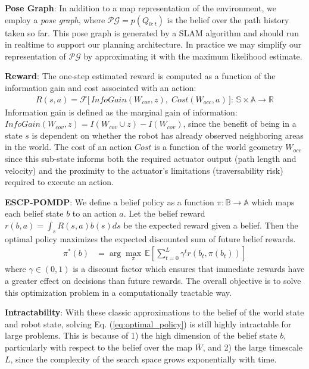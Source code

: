 \documentclass{article}
\newcommand{\ph}[1]{{\textbf{#1}:}} %
\begin{document}
\ph{Pose Graph} In addition to a map representation of the environment, we employ a \textit{pose graph}, where $\mathcal{PG} = p(Q_{0:t})$ is the belief over the path history taken so far.  This pose graph is generated by a SLAM algorithm and should run in realtime to support our planning architecture.  In practice we may simplify our representation of $\mathcal{PG}$ by approximating it with the maximum likelihood estimate.

\ph{Reward} The one-step estimated reward is computed as a function of the information gain and cost associated with an action:
\begin{align}
    {R}(s, a) = \mathcal{F}\Big[\, \textit{InfoGain}(W_{cov}, z), \; \textit{Cost}(W_{occ}, a) \, \Big]: \, \mathbb{S} \times \mathbb{A} \rightarrow \mathbb{R} 
\end{align}
Information gain is defined as the marginal gain of information: $\textit{InfoGain}(W_{cov}, z) = I(W_{cov} \cup z) - I(W_{cov})$, since the benefit of being in a state $s$ is dependent on whether the robot has already observed neighboring areas in the world. The cost of an action $Cost$ is a function of the world geometry $W_{occ}$ since this sub-state informs both the required actuator output (path length and velocity) and the proximity to the actuator's limitations (traversability risk) required to execute an action.

\ph{ESCP-POMDP} We define a belief policy as a function $\pi : \mathbb{B} \rightarrow \mathbb{A}$ which maps each belief state $b$ to an action $a$.  Let the belief reward $r(b,a)=\int_s R(s,a)b(s)ds$ be the expected reward given a belief.  Then the optimal policy maximizes the expected discounted sum of future belief rewards.
\begin{align}
  \pi^*(b) &= \arg\max_\pi \, \mathbb{E} \left[ \sum_{t=0}^{L} \gamma^t r(b_t, \pi(b_t)) \right]
  \label{eq:optimal_policy}
\end{align}
where $\gamma \in (0,1)$ is a discount factor which ensures that immediate rewards have a greater effect on decisions than future rewards. The overall objective is to solve this optimization problem in a computationally tractable way.

\ph{Intractability} 
With these classic approximations to the belief of the world state and robot state, solving Eq. (\ref{eq:optimal_policy}) is still highly intractable for large problems.  This is because of 1) the high dimension of the belief state $b$, particularly with respect to the belief over the map $\bar{W}$, and 2) the large timescale $L$, since the complexity of the search space grows exponentially with time.
\end{document}
